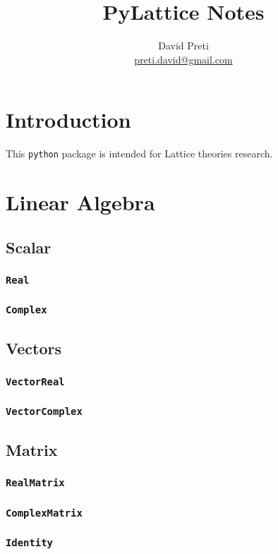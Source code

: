 \documentclass{article}
\title{PyLattice Notes}
\author{David Preti \\ \href{mailto:preti.david@gmail.com}{preti.david@gmail.com}}
\begin{document}
\maketitle


\section{Introduction}
This \texttt{python} package is intended for Lattice theories research. 

\section{Linear Algebra}
\subsection{Scalar}
\subsubsection*{\texttt{Real}}
\subsubsection*{\texttt{Complex}}

\subsection{Vectors}
\subsubsection*{\texttt{VectorReal}}
\subsubsection*{\texttt{VectorComplex}}

\subsection{Matrix}
\subsubsection*{\texttt{RealMatrix}}
\subsubsection*{\texttt{ComplexMatrix}}
\subsubsection*{\texttt{Identity}}
\end{document}
